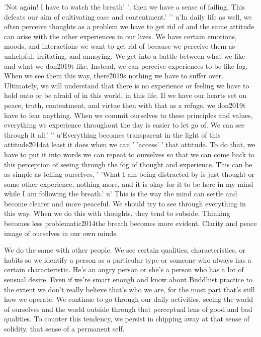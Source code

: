 'Not again! I have to watch the breath'
', then we have a sense of failing. This defeats our aim of cultivating ease and contentment.'
'\n'
u'In daily life as well, we often perceive thoughts as a problem we have to get rid of and the same attitude can arise with the other experiences in our lives. We have certain emotions, moods, and interactions we want to get rid of because we perceive them as unhelpful, irritating, and annoying. We get into a battle between what we like and what we don\u2019t like. Instead, we can perceive experiences to be like fog. When we see them this way, there\u2019s nothing we have to suffer over. Ultimately, we will understand that there is no experience or feeling we have to hold onto or be afraid of in this world, in this life. If we have our hearts set on peace, truth, contentment, and virtue then with that as a refuge, we don\u2019t have to fear anything. When we commit ourselves to these principles and values, everything we experience throughout the day is easier to let go of. We can see through it all.'
'\n'
u'Everything becomes transparent in the light of this attitude\u2014at least it does when we can '
'access'
' that attitude. To do that, we have to put it into words we can repeat to ourselves so that we can come back to this perception of seeing through the fog of thought and experience. This can be as simple as telling ourselves, '
'What I am being distracted by is just thought or some other experience, nothing more, and it is okay for it to be here in my mind while I am following the breath.'
u' This is the way the mind can settle and become clearer and more peaceful. We should try to see through everything in this way. When we do this with thoughts, they tend to subside. Thinking becomes less problematic\u2014the breath becomes more evident. Clarity and peace  image of 
ourselves in our own minds.

We do the same with other people. We see certain qualities, 
characteristics, or habits so we identify a person as a particular type 
or someone who always has a certain characteristic. He's an angry 
person or she's a person who has a lot of sensual desire. Even if we're 
smart enough and know about Buddhist practice to the extent we don't 
really believe that's who we are, for the most part that's still how we 
operate. We continue to go through our daily activities, seeing the 
world of ourselves and the world outside through that perceptual lens 
of good and bad qualities. To counter this tendency, we persist in 
chipping away at that sense of solidity, that sense of a permanent self.


